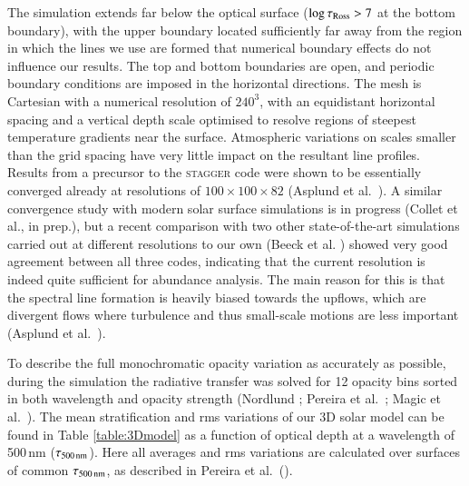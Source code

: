 \documentclass[traditabstract]{aa}
\begin{document}
The simulation extends far below the optical surface ($\log \tau_{\rm Ross}>7$ at the bottom boundary), with the upper boundary located sufficiently far away from the region in which the lines we use are formed that numerical boundary effects do not influence our results. The top and bottom boundaries are open, and periodic boundary conditions are imposed in the horizontal directions.  The mesh is Cartesian with a numerical resolution of $240^3$, with an equidistant horizontal spacing and a vertical depth scale optimised to resolve regions of steepest temperature gradients near the surface.  Atmospheric variations on scales smaller than the grid spacing have very little impact on the resultant line profiles. Results from a precursor to the \textsc{stagger} code were shown to be essentially converged already at resolutions of $100\times100\times82$ (Asplund et al.\ \cite{Asplund2000}).  A similar convergence study with modern solar surface simulations is in progress (Collet et al., in prep.), but a recent comparison with two other state-of-the-art simulations carried out at different resolutions to our own (Beeck et al. \cite{beeck2012}) showed very good agreement between all three codes, indicating that the current resolution is indeed quite sufficient for abundance analysis.  The main reason for this is that the spectral line formation is heavily biased towards the upflows, which are divergent flows where turbulence and thus small-scale motions are less important (Asplund et al.\ \cite{Asplund2000}).

To describe the full monochromatic opacity variation as accurately as possible, during the simulation the radiative transfer was solved for 12 opacity bins sorted in both wavelength and opacity strength (Nordlund \cite{nordlund82}; Pereira et al.\ \cite{pereira_models}; Magic et al.\ \cite{magic_stagger}).  The mean stratification and rms variations of our 3D solar model can be found in Table \ref{table:3Dmodel} as a function of optical depth at a wavelength of 500\,nm ($\tau_{500\,{\rm nm}}$).  Here all averages and rms variations are calculated over surfaces of common $\tau_{500\,{\rm nm}}$, as described in Pereira et al.\ (\cite{pereira_models}).
\end{document}
